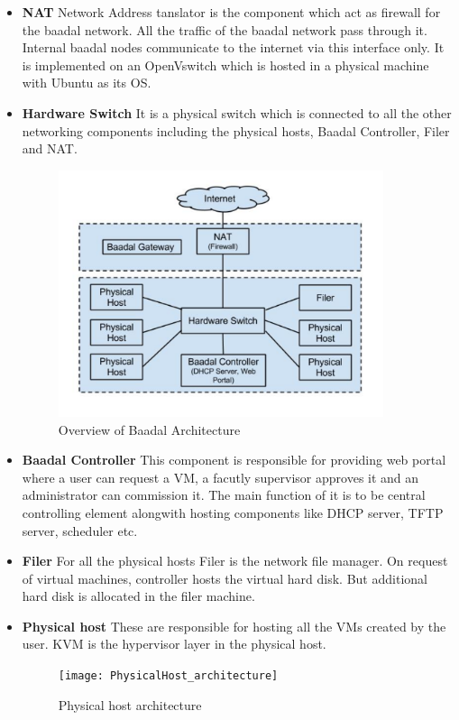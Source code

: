 \begin{itemize}
    \item \textbf{NAT} Network Address tanslator is the component which act as firewall for the baadal network. All the traffic of the baadal network pass through it. Internal baadal nodes communicate to the internet via this interface only. It is implemented on an OpenVswitch which is hosted in a physical machine with Ubuntu as its OS.
    \item \textbf{Hardware Switch} It is a physical switch which is connected to all the other networking components including the physical hosts, Baadal Controller, Filer and NAT.
    \begin{figure}[h]
\caption{Overview of Baadal Architecture}
\centering
\includegraphics[width=0.9\textwidth]{Baadal_architecture}
\end{figure}
    \item \textbf{Baadal Controller} This component is responsible for providing web portal where a user can request a VM, a facutly supervisor approves it and an administrator can commission it. The main function of it is to be central controlling element alongwith hosting components like DHCP server, TFTP server, scheduler etc.
    
    \item \textbf{Filer} For all the physical hosts Filer is the network file manager. On request of virtual machines, controller hosts the virtual hard disk. But additional hard disk is allocated in the filer machine.
    
    \item \textbf{Physical host} These are responsible for hosting all the VMs created by the user. KVM is the hypervisor layer in the physical host.
    
\begin{figure}[h]
\caption{Physical host architecture}
\centering
\texttt{[image: PhysicalHost\_architecture]}
\end{figure}
\end{itemize}


